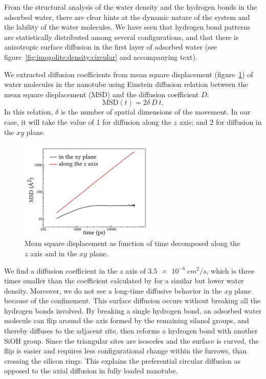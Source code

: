 \documentclass[thesis]{subfiles}
\begin{document}
From the structural analysis of the water density and the hydrogen bonds in the
adsorbed water, there are clear hints at the dynamic nature of the system and
the lability of the water molecules. We have seen that hydrogen bond patterns
are statistically distributed among several configurations, and that there is
anisotropic surface diffusion in the first layer of adsorbed water (see
figure~\ref{fig:imogolite:density:circular} and accompanying text).

We extracted diffusion coefficients from mean square displacement
(figure~\ref{fig:imogolite:msd}) of water molecules in the nanotube using
Einstein diffusion relation between the mean square displacement (MSD) and the
diffusion coefficient $D$:
\[ \text{MSD}(t) = 2 \delta \ D \ t. \]
In this relation, $\delta$ is the number of spatial dimensions of the movement.
In our case, it will take the value of 1 for diffusion along the $z$ axis; and 2
for diffusion in the $xy$ plane.

\begin{figure}[ht]
    \centering
    \includegraphics[width=0.6\textwidth]{figures/images/imogolite-msd}
    \caption{Mean square displacement as function of time decomposed along the
    $z$ axis and in the $xy$ plane.}
    \label{fig:imogolite:msd}
\end{figure}

We find a diffusion coefficient in the $z$ axis of $\SI{3.5e-6}{cm^2/s}$, which
is three times smaller than the coefficient calculated by
\citeauthor{Zang2009}\cite{Zang2009} for a similar but lower water density.
Moreover, we do not see a long-time diffusive behavior in the $xy$ plane because
of the confinement. This surface diffusion occurs without breaking all the
hydrogen bonds involved. By breaking a single hydrogen bond, an adsorbed water
molecule can flip around the axis formed by the remaining silanol groups, and
thereby diffuses to the adjacent site, then reforms a hydrogen bond with another
SiOH group. Since the triangular sites are isosceles and the surface is curved,
the flip is easier and requires less configurational change within the furrows,
than crossing the silicon rings. This explains the preferential circular
diffusion as opposed to the axial diffusion in fully loaded nanotube.
\end{document}
